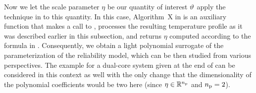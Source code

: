 Now we let the scale parameter $\eta$ be our quantity of interest $\vartheta$ apply the technique in  to this quantity.
In this case, Algorithm~X in  is an auxiliary function that makes a call to , processes the resulting temperature profile as it was described earlier in this subsection, and returns $\eta$ computed according to the formula in .
Consequently, we obtain a light polynomial surrogate of the parameterization of the reliability model, which can be then studied from various perspectives.
The example for a dual-core system given at the end of  can be considered in this context as well with the only change that the dimensionality of the polynomial coefficients would be two here (since $\eta \in \mathbb{R}^{n_\text{p}}$ and ${n_\text{p}} = 2$).
